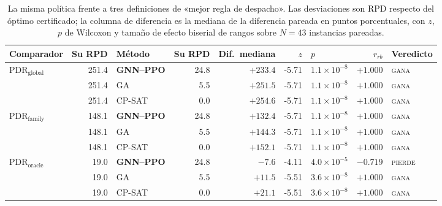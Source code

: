 \begin{table}[t]
\caption{La misma política frente a tres definiciones de «mejor regla de despacho». Las desviaciones son RPD respecto del óptimo certificado; la columna de diferencia es la mediana de la diferencia pareada en puntos porcentuales, con $z$, $p$ de Wilcoxon y tamaño de efecto biserial de rangos sobre $N=43$ instancias pareadas.}\label{tbl:comparators}
\begin{tabular*}{\tblwidth}{@{}LrLrrrlrl@{}}
\toprule
Comparador & Su RPD & Método & Su RPD & Dif.\ mediana & $z$ & $p$ & $r_{rb}$ & Veredicto \\
\midrule
$\mathrm{PDR}_{\mathrm{global}}$ & 251.4 & \textbf{GNN--PPO} & 24.8 & $+233.4$ & -5.71 & $1.1\times10^{-8}$ & $+1.000$ & \textsc{gana} \\
 & 251.4 & GA & 5.5 & $+251.5$ & -5.71 & $1.1\times10^{-8}$ & $+1.000$ & \textsc{gana} \\
 & 251.4 & CP-SAT & 0.0 & $+254.6$ & -5.71 & $1.1\times10^{-8}$ & $+1.000$ & \textsc{gana} \\
$\mathrm{PDR}_{\mathrm{family}}$ & 148.1 & \textbf{GNN--PPO} & 24.8 & $+132.4$ & -5.71 & $1.1\times10^{-8}$ & $+1.000$ & \textsc{gana} \\
 & 148.1 & GA & 5.5 & $+144.3$ & -5.71 & $1.1\times10^{-8}$ & $+1.000$ & \textsc{gana} \\
 & 148.1 & CP-SAT & 0.0 & $+152.1$ & -5.71 & $1.1\times10^{-8}$ & $+1.000$ & \textsc{gana} \\
$\mathrm{PDR}_{\mathrm{oracle}}$ & 19.0 & \textbf{GNN--PPO} & 24.8 & $-7.6$ & -4.11 & $4.0\times10^{-5}$ & $-0.719$ & \textsc{pierde} \\
 & 19.0 & GA & 5.5 & $+11.5$ & -5.51 & $3.6\times10^{-8}$ & $+1.000$ & \textsc{gana} \\
 & 19.0 & CP-SAT & 0.0 & $+21.1$ & -5.51 & $3.6\times10^{-8}$ & $+1.000$ & \textsc{gana} \\
\bottomrule
\end{tabular*}
\end{table}
